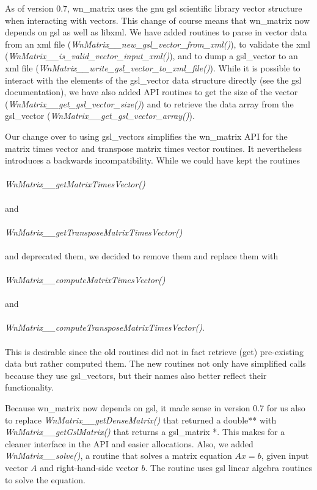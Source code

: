 \documentclass{article}    %
\begin{document}
As of version 0.7, wn\_matrix uses the gnu gsl scientific library vector
structure when interacting with vectors.  This change of course means that
wn\_matrix now depends on gsl as well as libxml.  We have added routines to
parse in vector data from an xml file
({\em WnMatrix\_\_new\_gsl\_vector\_from\_xml()}),
to validate the xml ({\em WnMatrix\_\_is\_valid\_vector\_input\_xml()}),
and to dump a gsl\_vector to an xml file
({\em WnMatrix\_\_write\_gsl\_vector\_to\_xml\_file()}).
While it is possible to interact with the elements of the gsl\_vector data
structure directly (see the gsl documentation),
we have also added API routines to get the size of the
vector ({\em WnMatrix\_\_get\_gsl\_vector\_size()}) and to retrieve the data
array from the gsl\_vector ({\em WnMatrix\_\_get\_gsl\_vector\_array()}).

Our change over to using gsl\_vectors simplifies the wn\_matrix API for
the matrix times vector and transpose matrix times vector routines.
It nevertheless introduces a backwards incompatibility.  While we could have
kept the routines\\
\\{\em WnMatrix\_\_getMatrixTimesVector()}\\
\\and\\
\\{\em WnMatrix\_\_getTransposeMatrixTimesVector()}\\ \\
and deprecated them, we
decided to remove them and replace them with\\
\\{\em WnMatrix\_\_computeMatrixTimesVector()}\\ \\
and\\ \\
{\em WnMatrix\_\_computeTransposeMatrixTimesVector()}.\\ \\
This is desirable since the old routines did not in fact retrieve (get)
pre-existing data but rather computed them.  The new routines not only
have simplified calls because they use gsl\_vectors,
but their names also better reflect their functionality.

Because wn\_matrix now depends on gsl, it made sense in version 0.7
for us also to replace
{\em WnMatrix\_\_getDenseMatrix()} that returned a double** with
{\em WnMatrix\_\_getGslMatrix()} that returns a gsl\_matrix *.  This makes
for a cleaner interface in the API and easier allocations.  Also, we
added {\em WnMatrix\_\_solve()}, a routine that solves a matrix equation
$A x = b$, given input vector $A$ and right-hand-side vector $b$.  The
routine uses gsl linear algebra routines to solve the equation.
\end{document}
